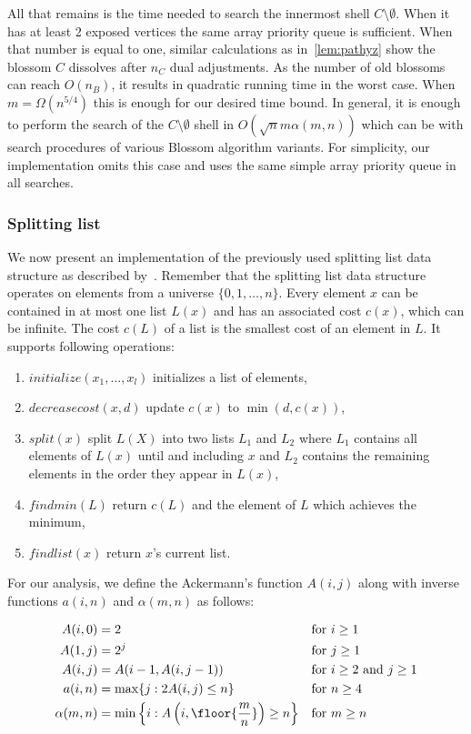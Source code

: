 All that remains is the time needed to search the innermost shell $C \setminus \emptyset$. When it has at least 2 exposed vertices the same array priority queue is sufficient. When that number is equal to one, similar calculations as in~\ref{lem:pathyz} show the blossom $C$ dissolves after $n_C$ dual adjustments. As the number of old blossoms can reach $O(n_B)$, it results in quadratic running time in the worst case. When $m = \Omega(n^{5/4})$ this is enough for our desired time bound. In general, it is enough to perform the search of the $C \setminus \emptyset$ shell in $O(\sqrt{n}m \alpha(m,n))$ which can be with search procedures of various Blossom algorithm variants. For simplicity, our implementation omits this case and uses the same simple array priority queue in all searches.

\subsubsection{Splitting list}

We now present an implementation of the previously used splitting list data structure as described by~\cite{gabow1985scaling}. Remember that the splitting list data structure operates on elements from a universe $\{0, 1, \dots, n\}$. Every element $x$ can be contained in at most one list $L(x)$ and has an associated cost $c(x)$, which can be infinite. The cost $c(L)$ of a list is the smallest cost of an element in $L$. It supports following operations:

\begin{enumerate}
    \item $initialize(x_1, \dots, x_l)$ initializes a list of elements,
    \item $decreasecost(x, d)$ update $c(x)$ to $\min(d, c(x))$,
    \item $split(x)$ split $L(X)$ into two lists $L_1$ and $L_2$ where $L_1$ contains all elements of $L(x)$ until and including $x$ and $L_2$ contains the remaining elements in the order they appear in $L(x)$,
    \item $findmin(L)$ return $c(L)$ and the element of $L$ which achieves the minimum,
    \item $findlist(x)$ return $x$'s current list.
\end{enumerate}

For our analysis, we define the Ackermann's function $A(i,j)$ along with inverse functions $a(i,n)$ and $\alpha(m, n)$ as follows:

\begin{align*}
    A(i,0) &= 2 &&\text{for $i \geq 1$} \\
    A(1,j) &= 2^j &&\text{for $j \geq 1$} \\
    A(i,j) &= A(i-1,A(i, j-1)) &&\text{for $i \geq 2$ and $j \geq 1$} \\
    a(i,n) &= \max \{ j: 2A(i,j) \leq n \} &&\text{for $n \geq 4$} \\
    \alpha(m,n) &= \min \left\{ i: A\left(i,\floor{\frac{m}{n}}\right) \geq n \right\} &&\text{for $m \geq n$}
\end{align*}

